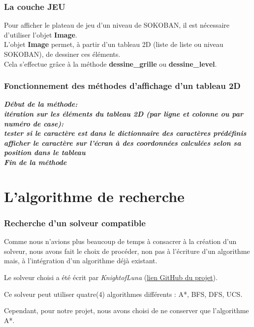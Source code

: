 \documentclass[13pt]{beamer}
\begin{document}
\begin{frame}
    \frametitle{La couche JEU}
    Pour afficher le plateau de jeu d'un niveau de SOKOBAN, il est nécessaire d'utiliser l'objet \textbf{Image}.
    \\
    L'objet \textbf{Image} permet, à partir d'un tableau 2D (liste de liste ou niveau SOKOBAN), de dessiner ces éléments.\\
    Cela s'effectue grâce à la méthode \textbf{dessine\_grille} ou \textbf{dessine\_level}.
\end{frame}

\begin{frame}
    \frametitle{Fonctionnement des méthodes d'affichage d'un tableau 2D}
    \textbf{\emph{Début de la méthode:
                    \\
                    \bigskip 
                    \tabto{2em}itération sur les éléments du tableau 2D (par ligne et colonne ou par numéro de case):
                    \\
                    \tabto{3em} tester si le caractère est dans le dictionnaire des caractères prédéfinis
                    \\
                    \tabto{4em} afficher le caractère sur l'écran à des coordonnées calculées selon sa position dans le tableau
                    \\
                    \bigskip 
                    Fin de la méthode}}
\end{frame}
\section{L'algorithme de recherche}
\begin{frame}
    \frametitle{Recherche d'un solveur compatible}
    Comme nous n'avions plus beaucoup de temps à consacrer à la création d'un solveur, nous avons fait le choix de procéder, non pas à l'écriture d'un algorithme mais, à l'intégration d'un algorithme déjà existant.
    
    \medskip
    
    Le solveur choisi a été écrit par \textit{KnightofLuna} (\href{https://github.com/KnightofLuna/sokoban-solver}{lien GitHub du projet}).
    
    \medskip
    
    Ce solveur peut utiliser quatre(4) algorithmes différents : A*, BFS, DFS, UCS.
    
    \medskip
    
    Cependant, pour notre projet, nous avons choisi de ne conserver que l'algorithme A*.
\end{frame}
\end{document}
